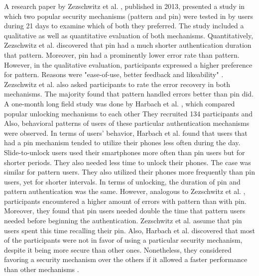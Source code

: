 A research paper by Zezschwitz et al. \cite{PatternWild}, published in 2013, presented a study in which two popular security mechanisms (pattern and pin) were tested in by users during 21 days to examine which of both they preferred. The study included a qualitative as well as quantitative evaluation of both mechanisms. Quantitatively, Zezschwitz et al. \cite{PatternWild} discovered that pin had a much shorter authentication duration that pattern. Moreover, pin had a prominently lower error rate than pattern. However, in the qualitative evaluation, participants expressed a higher preference for pattern. Reasons were "ease-of-use, better feedback and likeability" \cite{PatternWild}. Zezschwitz et al. \cite{PatternWild} also asked participants to rate the error recovery in both mechanisms. The majority found that pattern handled errors better than pin did.\\

A one-month long field study was done by Harbach et al. \cite{AnatomySmartphone}, which compared popular unlocking mechanisms to each other They recruited 134 participants and Also, behavioral patterns of users of these particular authentication mechanisms were observed. In terms of users' behavior, Harbach et al. \cite{PatternWild} found that users that had a pin mechanism tended to utilize their phones less often during the day. Slide-to-unlock users used their smartphones more often than pin users but for shorter periods. They also needed less time to unlock their phones. The case was similar for pattern users. They also utilized their phones more frequently than pin users, yet for shorter intervals. In terms of unlocking, the duration of pin and pattern authentication was the same. However, analogous to Zezschwitz et al. \cite{PatternWild}, participants encountered a higher amount of errors with pattern than with pin.
Moreover, they found that pin users needed double the time that pattern users needed before beginning the authentication. Zezschwitz et al. \cite{AnatomySmartphone} assume that pin users spent this time recalling their pin. Also, Harbach et al. \cite{AnatomySmartphone} discovered that most of the participants were not in favor of using a particular security mechanism, despite it being more secure than other ones. Nonetheless, they considered favoring a security mechanism over the others if it allowed a faster performance than other mechanisms \cite{AnatomySmartphone,Albayram:2017:BUL:3235924.3235929}.\\

